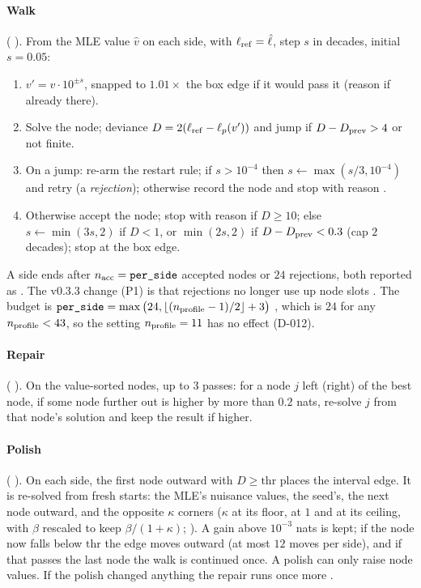 \paragraph{Walk} ( ). From the MLE value $\hat v$ on each side,
with $\ell_{\rm ref}=\hat\ell$, step $s$ in decades, initial $s=0.05$:
\begin{enumerate}[nosep]
  \item $v'=v\cdot10^{\pm s}$, snapped to $1.01\times$ the box edge if it would pass it (reason 
    if already there).
  \item Solve the node; deviance $D=2(\ell_{\rm ref}-\ell_p(v'))$ and jump if $D-D_{\rm prev}>4$ or not finite.
  \item On a jump: re-arm the restart rule; if $s>10^{-4}$ then $s\leftarrow\max(s/3,10^{-4})$ and
    retry (a \emph{rejection}); otherwise record the node and stop with reason .
  \item Otherwise accept the node; stop with reason  if $D\ge10$; else $s\leftarrow\min(3s,2)$ if
    $D<1$, or $\min(2s,2)$ if $D-D_{\rm prev}<0.3$ (cap $2$ decades); stop at the box edge.
\end{enumerate}
A side ends after $n_{\rm acc}=\texttt{per\_side}$ accepted nodes or $24$ rejections, both reported as
. The v0.3.3 change (P1) is that rejections no longer use up node slots
. The budget is
$\texttt{per\_side}=\max\big(24,\lfloor(n_{\rm profile}-1)/2\rfloor+3\big)$ ,
which is $24$ for any $n_{\rm profile}<43$, so the setting $n_{\rm profile}=11$ has no effect (D-012).

\paragraph{Repair} ( ). On the value-sorted nodes, up to $3$
passes: for a node $j$ left (right) of the best node, if some node further out is higher by more than $0.2$
nats, re-solve $j$ from that node's solution and keep the result if higher.

\paragraph{Polish} ( ). On each side, the first node outward with
$D\ge\mathrm{thr}$ places the interval edge. It is re-solved from fresh starts: the MLE's nuisance values, the
seed's, the next node outward, and the opposite $\kappa$ corners ($\kappa$ at its floor, at $1$ and at its
ceiling, with $\beta$ rescaled to keep $\beta/(1+\kappa)$; 
). A gain above $10^{-3}$ nats is kept; if the node now falls below
$\mathrm{thr}$ the edge moves outward (at most $12$ moves per side), and if that passes the last node the walk
is continued once. A polish can only raise node values. If the polish changed anything the repair runs once more
.

